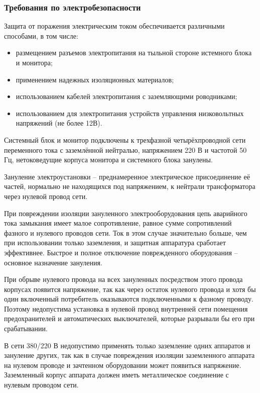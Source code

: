 \subsubsection{Требования по электробезопасности}
Защита от поражения электрическим током обеспечивается различными способами, в том числе:
\begin{itemize}
	\item размещением разъемов электропитания на тыльной стороне истемного блока и монитора;
	\item применением надежных изоляционных материалов;
	\item использованием кабелей электропитания с заземляющими роводниками;
	\item использованием для электропитания устройств управления низковольтных напряжений (не более 12В).
\end{itemize}

Системный блок и монитор подключены к трехфазной четырёхпроводной сети переменного тока с заземлённой нейтралью, напряжением 220 В и частотой 50 Гц, нетоковедущие корпуса монитора и системного блока занулены.

Зануление электроустановки -- преднамеренное электрическое присоединение её частей, нормально не находящихся под напряжением, к нейтрали трансформатора через нулевой провод сети.

При повреждении изоляции зануленного электрооборудования цепь аварийного тока замыкания имеет малое сопротивление, равное сумме сопротивлений фазного и нулевого проводов сети. Ток в этом случае значительно больше, чем при использовании только заземления, и защитная аппаратура сработает эффективнее. Быстрое и полное отключение поврежденного оборудования -- основное назначение зануления.

При обрыве нулевого провода на всех зануленных посредством этого провода корпусах появится напряжение, так как через остаток нулевого провода и хотя бы один включенный потребитель оказываются подключенными к фазному проводу. Поэтому недопустима установка в нулевой провод внутренней сети помещения предохранителей и автоматических выключателей, которые разрывали бы его при срабатывании.

В сети 380/220 В недопустимо применять только заземление одних аппаратов и зануление других, так как в случае повреждения изоляции заземленного аппарата на нулевом проводе и зачтенном оборудовании может появиться напряжение. Заземленный корпус аппарата должен иметь металлическое соединение с нулевым проводом сети.

